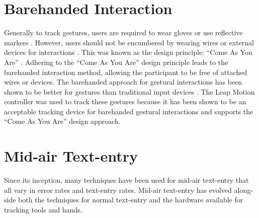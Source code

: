 \section{Barehanded Interaction} \label{barehanded_interaction}
Generally to track gestures, users are required to wear gloves or use reflective markers \cite{ref_vulture,ref_airstroke}. However, users should not be encumbered by wearing wires or external devices for interactions \cite{ref_natural_interactions}. This was known as the design principle: ``Come As You Are'' \cite{ref_come_as_you_are}. Adhering to the ``Come As You Are'' design principle leads to the barehanded interaction method, allowing the participant to be free of attached wires or devices. The barehanded approach for gestural interactions has been shown to be better for gestures than traditional input devices \cite{ref_barehanded_interaction}. The Leap Motion controller was used to track these gestures because it has been shown to be an acceptable tracking device for barehanded gestural interactions \cite{ref_alvin_thesis,ref_darren_thesis,ref_leap_device_evaluation_1,ref_leap_device_evaluation_2,ref_leap_pointing_device} and supports the ``Come As You Are'' design approach.

\section{Mid-air Text-entry} \label{mid_air_text_entry}
Since its inception, many techniques have been used for mid-air text-entry that all vary in error rates and text-entry rates. Mid-air text-entry has evolved along-side both the techniques for normal text-entry and the hardware available for tracking tools and hands.

